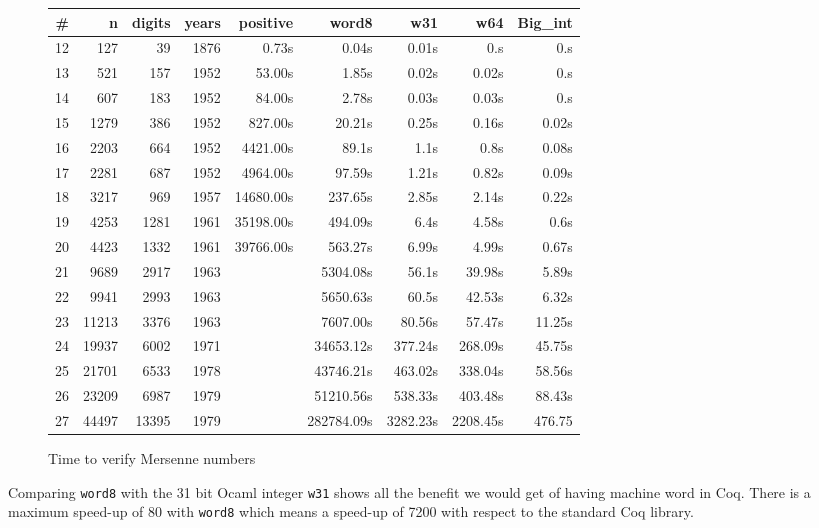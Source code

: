 \begin{figure}
\begin{center}
\begin{tabular}{|r|r|r|r|r|r|r|r|r |}
\hline
\# & n & digits & years &  positive & word8 & w31 & w64 & Big\_int\\
\hline
12 &  127 &  39 & 1876 &  0.73s & 0.04s & 0.01s & 0.s & 0.s \\
13 &  521 & 157 & 1952 &  53.00s & 1.85s & 0.02s & 0.02s &  0.s\\
14 &  607 & 183 & 1952 &  84.00s & 2.78s & 0.03s & 0.03s &  0.s\\
15 & 1279 & 386 & 1952 &  827.00s & 20.21s& 0.25s & 0.16s &  0.02s\\
16 & 2203 & 664 & 1952 &  4421.00s & 89.1s & 1.1s & 0.8s &  0.08s\\
17 & 2281 & 687 & 1952 &  4964.00s & 97.59s & 1.21s & 0.82s &  0.09s\\
18 & 3217 & 969 & 1957 &  14680.00s & 237.65s & 2.85s & 2.14s &  0.22s\\
19 & 4253 & 1281 & 1961 &35198.00s & 494.09s& 6.4s & 4.58s &  0.6s\\
20 & 4423 & 1332 & 1961 &  39766.00s & 563.27s & 6.99s & 4.99s &  0.67s\\
21 & 9689 & 2917  & 1963 &   & 5304.08s & 56.1s & 39.98s &  5.89s\\	 
22 & 9941 & 2993  & 1963 &   & 5650.63s & 60.5s & 42.53s &  6.32s\\	 
23 & 11213 & 3376 & 1963 &    & 7607.00s & 80.56s & 57.47s &  11.25s\\ 
24 & 19937 & 6002  & 1971 &  & 34653.12s & 377.24s & 268.09s &  45.75s\\
25 & 21701 & 6533 & 1978 &  &43746.21s & 463.02s & 338.04s &  58.56s \\
26 & 23209 & 6987 & 1979  &  &51210.56s & 538.33s & 403.48s &  88.43s\\
27 & 44497 & 13395 & 1979  &  &282784.09s & 3282.23s & 2208.45s &  476.75 \\
\hline

\end{tabular}
\end{center}
\caption{Time to verify Mersenne numbers}
\label{fig:Mersenne}
\end{figure}

Comparing {\tt word8} with the 31 bit {\sc Ocaml} integer {\tt w31} shows all the benefit we would
get of having machine word in {\sc Coq}. There is a maximum speed-up of 80 with {\tt word8} which
means a speed-up of 7200 with respect to the standard {\sc Coq} library.

